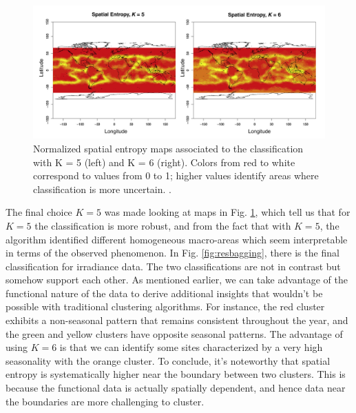 \begin{figure}[H]
    \centering
    \includegraphics[scale=0.5]{Images/irrentropy.png}
    \caption[Spatial entropy for irradiance data.]{Normalized spatial entropy maps associated to the classification with K = 5 (left) and K = 6 (right). Colors from red to white correspond to values from 0 to 1; higher values identify areas where classification is more uncertain. \cite{secchi_bagging_2013}.}
    \label{fig:irrentropy}
\end{figure}
The final choice $K=5$ was made looking at maps in Fig. \ref{fig:irrentropy}, which tell us that for $K=5$ the classification is more robust, and from the fact that with $K=5$, the algorithm identified different homogeneous macro-areas which seem interpretable in terms of the observed phenomenon. In Fig. \ref{fig:resbagging}, there is the final classification for irradiance data. The two classifications are not in contrast but somehow support each other. As mentioned earlier, we can take advantage of the functional nature of the data to derive additional insights that wouldn't be possible with traditional clustering algorithms. For instance, the red cluster exhibits a non-seasonal pattern that remains consistent throughout the year, and the green and yellow clusters have opposite seasonal patterns. The advantage of using $K=6$ is that we can identify some sites characterized by a very high seasonality with the orange cluster. To conclude, it's noteworthy that spatial entropy is systematically higher near the boundary between two clusters. This is because the functional data is actually spatially dependent, and hence data near the boundaries are more challenging to cluster.
